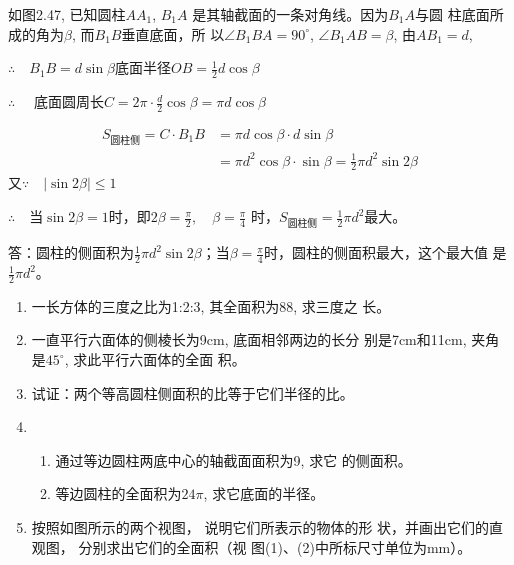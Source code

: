 \begin{solution}
    如图2.47, 已知圆柱$AA_1$, $B_1A$
    是其轴截面的一条对角线。因为$B_1A$与圆
    柱底面所成的角为$\beta$, 而$B_1B$垂直底面，所
    以$\angle B_1BA=90^{\circ}$, $\angle B_1AB=\beta$, 由$AB_1=d$,
    
$\therefore\quad B_1B=d\sin\beta$\quad 底面半径$OB=\frac{1}{2}d\cos\beta$

$\therefore\quad$ 底面圆周长$C=2\pi\cdot \frac{d}{2}\cos\beta=\pi d\cos\beta$

\[\begin{split}
    S_{\text{圆柱侧}}=C\cdot B_1B&=\pi d\cos\beta\cdot d\sin\beta\\ 
&=\pi d^2\cos\beta\cdot \sin\beta=\frac{1}{2}\pi d^2\sin2\beta
\end{split}\]
又$\because\quad |\sin2\beta|\le 1$

$\therefore\quad $当$\sin2\beta=1$时，即$2\beta=\frac{\pi}{2},\quad \beta=\frac{\pi}{4}$
时，$ S_{\text{圆柱侧}}=\frac{1}{2}\pi d^2$最大。

答：圆柱的侧面积为$\frac{1}{2}\pi d^2\sin2\beta$；当$\beta=\frac{\pi}{4}$时，圆柱的侧面积最大，这个最大值
是$\frac{1}{2}\pi d^2$。
\end{solution}

\begin{ex}
\begin{enumerate}
    \item 一长方体的三度之比为1:2:3, 其全面积为88, 求三度之
    长。
    \item 一直平行六面体的侧棱长为9cm, 底面相邻两边的长分
    别是7cm和11cm, 夹角是$45^{\circ}$, 求此平行六面体的全面
    积。
    \item 试证：两个等高圆柱侧面积的比等于它们半径的比。
    \item \begin{enumerate}
    \item 通过等边圆柱两底中心的轴截面面积为9, 求它
    的侧面积。
    \item 等边圆柱的全面积为$24\pi$, 
    求它底面的半径。
    \end{enumerate}

    \item 按照如图所示的两个视图，
    说明它们所表示的物体的形
    状，并画出它们的直观图，
    分别求出它们的全面积（视
    图(1)、(2)中所标尺寸单位为mm）。
\end{enumerate} 
\end{ex}


